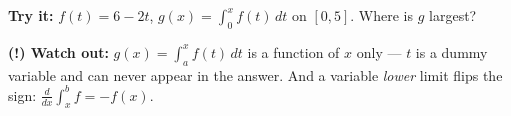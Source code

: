 \documentclass[12pt]{article}
\begin{document}
\begin{tryitbox}
\textbf{Try it:} \quad $f(t) = 6 - 2t$, $g(x) = \int_0^{x} f(t)\,dt$ on
$[0,5]$. Where is $g$ largest?\\[2pt]
\end{tryitbox}

\begin{watchoutbox}
\textbf{(!) Watch out:} $g(x) = \int_a^x f(t)\,dt$ is a function of $x$ only --- $t$ is a
dummy variable and can never appear in the answer. And a variable \emph{lower} limit flips
the sign: $\frac{d}{dx}\int_x^b f = -f(x)$.
\end{watchoutbox}
\end{document}
